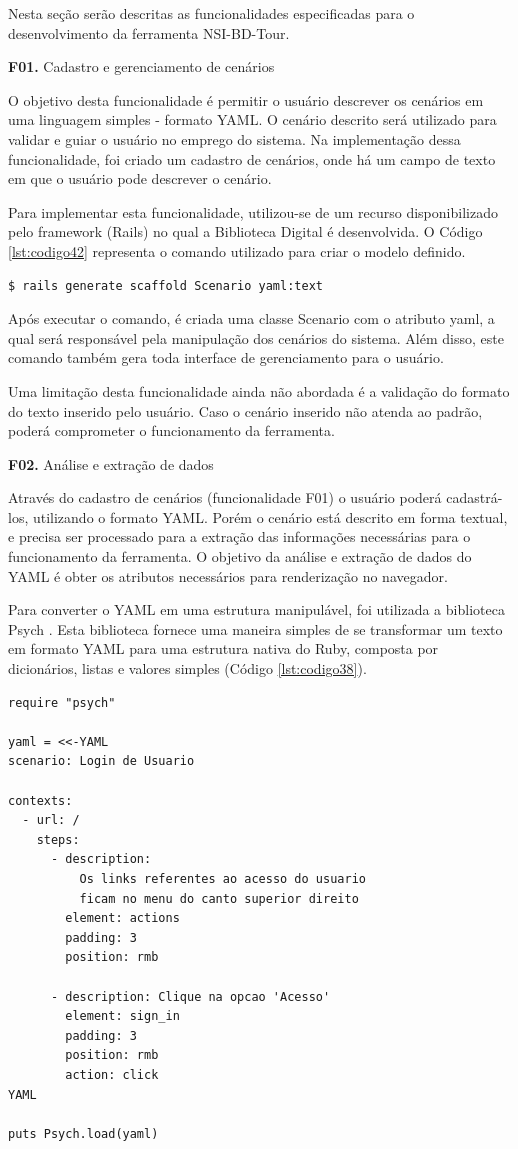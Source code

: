 Nesta seção serão descritas as funcionalidades especificadas para o desenvolvimento da ferramenta NSI-BD-Tour.

\textbf{F01.} Cadastro e gerenciamento de cenários

O objetivo desta funcionalidade é permitir o usuário descrever os cenários em uma linguagem simples - formato YAML. O cenário descrito será utilizado para validar e guiar o usuário no emprego do sistema. Na implementação dessa funcionalidade, foi criado um cadastro de cenários, onde há um campo de texto em que o usuário pode descrever o cenário.

Para implementar esta funcionalidade, utilizou-se de um recurso disponibilizado pelo framework (Rails) no qual a Biblioteca Digital é desenvolvida. O Código \ref{lst:codigo42} representa o comando utilizado para criar o modelo definido.

{\singlespace
\begin{lstlisting}[caption=Comando para gerar um modelo,label={lst:codigo42}]
$ rails generate scaffold Scenario yaml:text
\end{lstlisting}
}

Após executar o comando, é criada uma classe Scenario com o atributo yaml, a qual será responsável pela manipulação dos cenários do sistema. Além disso, este comando também gera toda interface de gerenciamento para o usuário.

Uma limitação desta funcionalidade ainda não abordada é a validação do formato do texto inserido pelo usuário. Caso o cenário inserido não atenda ao padrão, poderá comprometer o funcionamento da ferramenta.

\textbf{F02.} Análise e extração de dados

Através do cadastro de cenários (funcionalidade F01) o usuário poderá cadastrá-los, utilizando o formato YAML. Porém o cenário está descrito em forma textual, e precisa ser processado para a extração das informações necessárias para o funcionamento da ferramenta. O objetivo da análise e extração de dados do YAML é obter os atributos necessários para renderização no navegador.

Para converter o YAML em uma estrutura manipulável, foi utilizada a biblioteca Psych \cite{PSYCH}. Esta biblioteca fornece uma maneira simples de se transformar um texto em formato YAML para uma estrutura nativa do Ruby, composta por dicionários, listas e valores simples (Código \ref{lst:codigo38}).

{\singlespace
\begin{lstlisting}[caption=Exemplo de cenário escrito em \textit{YAML},label={lst:codigo38}]
require "psych"

yaml = <<-YAML
scenario: Login de Usuario

contexts:
  - url: /
    steps:
      - description:
          Os links referentes ao acesso do usuario
          ficam no menu do canto superior direito
        element: actions
        padding: 3
        position: rmb

      - description: Clique na opcao 'Acesso'
        element: sign_in
        padding: 3
        position: rmb
        action: click
YAML

puts Psych.load(yaml)
\end{lstlisting}
}

